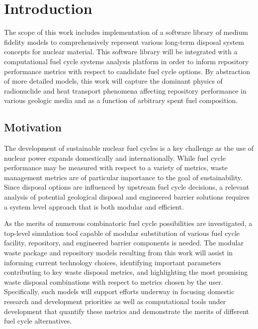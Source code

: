 \chapter{Introduction}\label{ch:introduction}


The scope of this work includes implementation of a software library of medium 
fidelity models to comprehensively represent various long-term disposal system 
concepts for nuclear material. This software library will be integrated with a 
computational fuel cycle systems analysis platform in order to inform repository 
performance metrics with respect to candidate fuel cycle options. By abstraction 
of more detailed models, this work will capture the dominant physics of 
radionuclide and heat transport phenomena affecting repository performance in 
various geologic media and as a function of arbitrary spent fuel composition. 

\section{Motivation} 


The development of sustainable nuclear fuel cycles is a key challenge as the use 
of nuclear power expands domestically and internationally. While fuel cycle 
performance may be measured with respect to a variety of metrics, waste
management metrics are of particular importance to the goal of sustainability. 
Since disposal options are influenced by upstream fuel cycle decisions, a 
relevant analysis of potential geological disposal and engineered barrier 
solutions requires a system level approach that is both modular and efficient. 


As the merits of numerous combinatoric fuel cycle possibilities are 
investigated, a top-level simulation tool capable of modular substitution of 
various fuel cycle facility, repository, and engineered barrier components is 
needed. The modular waste package and repository models resulting from this work 
will assist in informing current technology choices, identifying important 
parameters contributing to key waste disposal metrics, and highlighting the most 
promising waste disposal combinations with respect to metrics chosen by
the user. Specifically, such models will support efforts underway in focusing 
domestic research and development priorities as well as computational tools 
under development that quantify these metrics and demonstrate the merits of 
different fuel cycle alternatives. 

